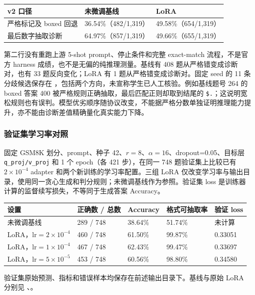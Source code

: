 \documentclass[UTF8,a4paper,12pt,fontset=none]{ctexart}
\begin{document}
\noindent\begin{tabularx}{\textwidth}{YYY}
\toprule
v2 口径 & 未微调基线 & LoRA \\
\midrule
严格标记及 boxed 回退 & 36.54\%（482/1,319） & 49.58\%（654/1,319） \\
最后数字抽取诊断 & 64.97\%（857/1,319） & 49.66\%（655/1,319） \\
\bottomrule
\end{tabularx}

第二行没有重跑上游 5-shot prompt、停止条件和完整 exact-match 流程，不是官方 harness 成绩，也不是无偏的纯推理测量。基线有 408 题从严格错变成诊断对，也有 33 题反向变化；LoRA 有 1 题从严格错变成诊断对。固定 seed 的 11 条分歧候选保存在 ，包括两个方向，未宣称学生已人工核验。例如基线题号 264 的 boxed 答案 400 被严格规则正确抽取，最后匹配正则却取到结尾的 \texttt{\$.}；这说明宽松规则也有误判。模型优劣顺序随协议改变，不能据严格分数单独证明推理能力提升，亦不能由诊断差值精确量化真实能力下降。

\subsubsection{验证集学习率对照}
固定 GSM8K 划分、prompt、种子 42、$r=8$、$\alpha=16$、dropout=0.05、目标层 \texttt{q\_proj/v\_proj} 和 1 个 epoch（各 421 步），在同一 748 题验证集上比较已有 $2\times10^{-4}$ adapter 和两个新训练的学习率配置。三组 LoRA 仅改变学习率与输出目录，使用同一贪心生成和判分规则；未微调基线作为参照。验证集 loss 是训练器计算的监督续写损失，不等同于生成答案 Accuracy。

\noindent\begin{tabularx}{\textwidth}{>{\raggedright\arraybackslash}p{}YYYY}
\toprule
设置 & 正确数 / 总数 & Accuracy & 格式可抽取率 & 验证 loss \\
\midrule
未微调基线 & 289 / 748 & 38.64\% & 51.74\% & 未计算 \\
LoRA，$\mathrm{lr}=2\times10^{-4}$ & 460 / 748 & 61.50\% & 99.87\% & 0.33051 \\
LoRA，$\mathrm{lr}=1\times10^{-4}$ & 467 / 748 & 62.43\% & 99.47\% & 0.33697 \\
LoRA，$\mathrm{lr}=5\times10^{-5}$ & 453 / 748 & 60.56\% & 98.80\% & 0.34580 \\
\bottomrule
\end{tabularx}

验证集原始预测、指标和错误样本均保存在前述输出目录下。基线与原始 LoRA 分别见 、。
\end{document}

